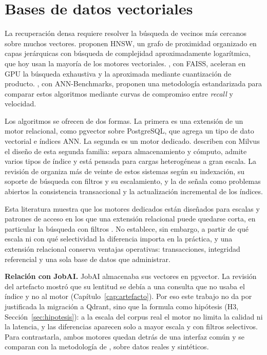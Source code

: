 \section{Bases de datos vectoriales}
\label{sec:estado-arte-vectordb}

La recuperación densa requiere resolver la búsqueda de vecinos más cercanos sobre muchos vectores. \citet{Malkov2020} proponen HNSW, un grafo de proximidad organizado en capas jerárquicas con búsqueda de complejidad aproximadamente logarítmica, que hoy usan la mayoría de los motores vectoriales. \citet{Johnson2019}, con FAISS, aceleran en GPU la búsqueda exhaustiva y la aproximada mediante cuantización de producto. \citet{Aumuller2020}, con ANN-Benchmarks, proponen una metodología estandarizada para comparar estos algoritmos mediante curvas de compromiso entre \textit{recall} y velocidad.

Los algoritmos se ofrecen de dos formas. La primera es una extensión de un motor relacional, como pgvector sobre PostgreSQL, que agrega un tipo de dato vectorial e índices ANN. La segunda es un motor dedicado. \citet{Wang2021} describen con Milvus el diseño de esta segunda familia: separa almacenamiento y cómputo, admite varios tipos de índice y está pensada para cargas heterogéneas a gran escala. La revisión de \citet{Pan2024} organiza más de veinte de estos sistemas según su indexación, su soporte de búsqueda con filtros y su escalamiento, y la de \citet{Taipalus2024} señala como problemas abiertos la consistencia transaccional y la actualización incremental de los índices.

Esta literatura muestra que los motores dedicados están diseñados para escalas y patrones de acceso en los que una extensión relacional puede quedarse corta, en particular la búsqueda con filtros \citep{Sanca2024}. No establece, sin embargo, a partir de qué escala ni con qué selectividad la diferencia importa en la práctica, y una extensión relacional conserva ventajas operativas: transacciones, integridad referencial y una sola base de datos que administrar.

\textbf{Relación con JobAI.} JobAI almacenaba sus vectores en pgvector. La revisión del artefacto mostró que su lentitud se debía a una consulta que no usaba el índice y no al motor (Capítulo~\ref{cap:artefacto}). Por eso este trabajo no da por justificada la migración a Qdrant, sino que la formula como hipótesis (H3, Sección~\ref{sec:hipotesis}): a la escala del corpus real el motor no limita la calidad ni la latencia, y las diferencias aparecen solo a mayor escala y con filtros selectivos. Para contrastarla, ambos motores quedan detrás de una interfaz común y se comparan con la metodología de \citet{Aumuller2020}, sobre datos reales y sintéticos.

